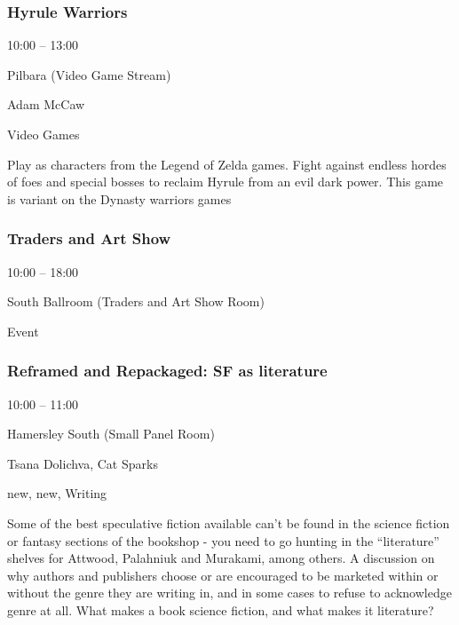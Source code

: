 \documentclass{scrreprt}
\begin{document}
\begin{multicols}{2}
\subsubsection*{Hyrule Warriors}\begin{description}
\setlength{\itemsep}{0pt}
\setlength{\parsep}{0pt}
\setlength{\parskip}{0pt}
\item[Time:]{10:00 -- 13:00}
\item[Venue:]{Pilbara (Video Game Stream)}
\item[People:]{Adam McCaw}
\item[Tags:]{Video Games}\end{description}
Play as characters from the Legend of Zelda games. Fight against endless hordes of foes and special bosses to reclaim Hyrule from an evil dark power. This game is variant on the Dynasty warriors games
\subsubsection*{Traders and Art Show}\begin{description}
\setlength{\itemsep}{0pt}
\setlength{\parsep}{0pt}
\setlength{\parskip}{0pt}
\item[Time:]{10:00 -- 18:00}
\item[Venue:]{South Ballroom (Traders and Art Show Room)}
\item[Tags:]{Event}\end{description}

\subsubsection*{Reframed and Repackaged: SF as literature}\begin{description}
\setlength{\itemsep}{0pt}
\setlength{\parsep}{0pt}
\setlength{\parskip}{0pt}
\item[Time:]{10:00 -- 11:00}
\item[Venue:]{Hamersley South (Small Panel Room)}
\item[People:]{Tsana Dolichva, Cat Sparks}
\item[Tags:]{new, new, Writing}\end{description}
Some of the best speculative fiction available can’t be found in the science fiction or fantasy sections of the bookshop - you need to go hunting in the “literature” shelves for Attwood, Palahniuk and Murakami, among others. A discussion on why authors and publishers choose or are encouraged to be marketed within or without the genre they are writing in, and in some cases to refuse to acknowledge genre at all. What makes a book science fiction, and what makes it literature?

\end{multicols}
\end{document}
